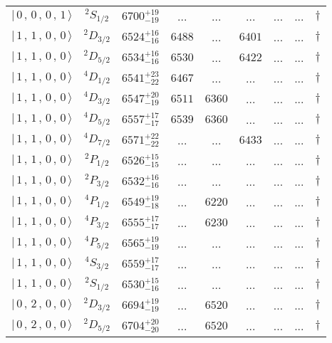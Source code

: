 \begin{tabular}{c c| c c c c c c c}
$\vert \,0\,,\,0\,,\,0\,,\,1 \,\rangle $ & $^{2}S_{1/2}$ & $6700^{+19}_{-19}$ & ... & ... & ... & ... & ... & $\dagger$ \\ 
$\vert \,1\,,\,1\,,\,0\,,\,0 \,\rangle $ & $^{2}D_{3/2}$ & $6524^{+16}_{-16}$ & $6488$ & ... & $6401$ & ... & ... & $\dagger$ \\ 
$\vert \,1\,,\,1\,,\,0\,,\,0 \,\rangle $ & $^{2}D_{5/2}$ & $6534^{+16}_{-16}$ & $6530$ & ... & $6422$ & ... & ... & $\dagger$ \\ 
$\vert \,1\,,\,1\,,\,0\,,\,0 \,\rangle $ & $^{4}D_{1/2}$ & $6541^{+23}_{-22}$ & $6467$ & ... & ... & ... & ... & $\dagger$ \\ 
$\vert \,1\,,\,1\,,\,0\,,\,0 \,\rangle $ & $^{4}D_{3/2}$ & $6547^{+20}_{-19}$ & $6511$ & $6360$ & ... & ... & ... & $\dagger$ \\ 
$\vert \,1\,,\,1\,,\,0\,,\,0 \,\rangle $ & $^{4}D_{5/2}$ & $6557^{+17}_{-17}$ & $6539$ & $6360$ & ... & ... & ... & $\dagger$ \\ 
$\vert \,1\,,\,1\,,\,0\,,\,0 \,\rangle $ & $^{4}D_{7/2}$ & $6571^{+22}_{-22}$ & ... & ... & $6433$ & ... & ... & $\dagger$ \\ 
$\vert \,1\,,\,1\,,\,0\,,\,0 \,\rangle $ & $^{2}P_{1/2}$ & $6526^{+15}_{-15}$ & ... & ... & ... & ... & ... & $\dagger$ \\ 
$\vert \,1\,,\,1\,,\,0\,,\,0 \,\rangle $ & $^{2}P_{3/2}$ & $6532^{+16}_{-16}$ & ... & ... & ... & ... & ... & $\dagger$ \\ 
$\vert \,1\,,\,1\,,\,0\,,\,0 \,\rangle $ & $^{4}P_{1/2}$ & $6549^{+19}_{-18}$ & ... & $6220$ & ... & ... & ... & $\dagger$ \\ 
$\vert \,1\,,\,1\,,\,0\,,\,0 \,\rangle $ & $^{4}P_{3/2}$ & $6555^{+17}_{-17}$ & ... & $6230$ & ... & ... & ... & $\dagger$ \\ 
$\vert \,1\,,\,1\,,\,0\,,\,0 \,\rangle $ & $^{4}P_{5/2}$ & $6565^{+19}_{-19}$ & ... & ... & ... & ... & ... & $\dagger$ \\ 
$\vert \,1\,,\,1\,,\,0\,,\,0 \,\rangle $ & $^{4}S_{3/2}$ & $6559^{+17}_{-17}$ & ... & ... & ... & ... & ... & $\dagger$ \\ 
$\vert \,1\,,\,1\,,\,0\,,\,0 \,\rangle $ & $^{2}S_{1/2}$ & $6530^{+15}_{-16}$ & ... & ... & ... & ... & ... & $\dagger$ \\ 
$\vert \,0\,,\,2\,,\,0\,,\,0 \,\rangle $ & $^{2}D_{3/2}$ & $6694^{+19}_{-19}$ & ... & $6520$ & ... & ... & ... & $\dagger$ \\ 
$\vert \,0\,,\,2\,,\,0\,,\,0 \,\rangle $ & $^{2}D_{5/2}$ & $6704^{+20}_{-20}$ & ... & $6520$ & ... & ... & ... & $\dagger$ \\ 
\hline \hline
\end{tabular}
